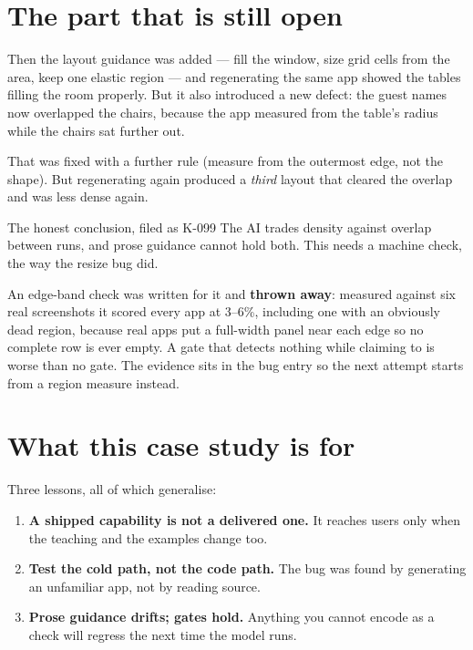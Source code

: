 \documentclass[11pt,a4paper]{report}
\begin{document}
\section{The part that is still open}

Then the layout guidance was added --- fill the window, size grid cells
from the area, keep one elastic region --- and regenerating the same app
showed the tables filling the room properly. But it also introduced a new
defect: the guest names now overlapped the chairs, because the app measured
from the table's radius while the chairs sat further out.

That was fixed with a further rule (measure from the outermost edge, not
the shape). But regenerating again produced a \emph{third} layout that
cleared the overlap and was less dense again.

\begin{warnbox}{The honest conclusion, filed as K-099}
The AI trades density against overlap between runs, and prose guidance
cannot hold both. This needs a machine check, the way the resize bug did.

An edge-band check was written for it and \textbf{thrown away}: measured
against six real screenshots it scored every app at 3--6\%, including one
with an obviously dead region, because real apps put a full-width panel
near each edge so no complete row is ever empty. A gate that detects
nothing while claiming to is worse than no gate. The evidence sits in the
bug entry so the next attempt starts from a region measure instead.
\end{warnbox}

\section{What this case study is for}

Three lessons, all of which generalise:

\begin{enumerate}[leftmargin=*]
  \item \textbf{A shipped capability is not a delivered one.} It reaches
    users only when the teaching and the examples change too.
  \item \textbf{Test the cold path, not the code path.} The bug was found
    by generating an unfamiliar app, not by reading source.
  \item \textbf{Prose guidance drifts; gates hold.} Anything you cannot
    encode as a check will regress the next time the model runs.
\end{enumerate}
\end{document}
